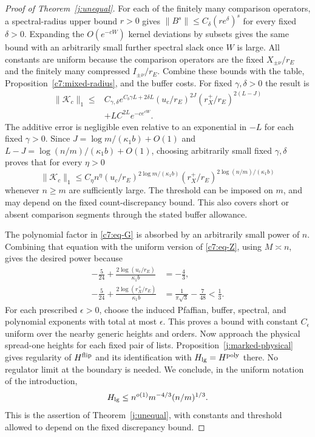 \begin{proof}[Proof of Theorem~\ref{j:unequal}]
For each of the finitely many comparison operators, a spectral-radius
upper bound $r>0$ gives $\|B^s\|\le C_\delta(re^\delta)^s$ for every
fixed $\delta>0$. Expanding the $O(e^{-cW})$ kernel deviations by
subsets gives the same bound with an arbitrarily small further spectral
slack once $W$ is large. All constants are uniform because the
comparison operators are the fixed $X_{\pm\nu}/r_E$ and the finitely
many compressed $I_{\pm\nu}/r_E$. Combine these bounds with the table,
Proposition~\ref{c7:mixed-radius}, and the buffer costs. For fixed
$\gamma,\delta>0$ the result is
\[
\begin{split}
 \|\mathcal K_c\|_1\le{}&C_{\gamma,\delta}
 e^{C_b\gamma L+2\delta L}
 (u_c/r_E)^{2J}(r_X^+/r_E)^{2(L-J)}\\
 &+LC^{2L}e^{-c e^{cW}}.
\end{split}
\]
The additive error is negligible even relative to an exponential in
$-L$ for each fixed $\gamma>0$. Since
$J=\log m/(\kappa_1b)+O(1)$ and
$L-J=\log(n/m)/(\kappa_1b)+O(1)$, choosing arbitrarily small fixed
$\gamma,\delta$ proves that for every $\eta>0$
\[
 \|\mathcal K_c\|_1\le C_\eta n^\eta
 (u_c/r_E)^{2\log m/(\kappa_1b)}
 (r_X^+/r_E)^{2\log(n/m)/(\kappa_1b)}
\]
whenever $n\ge m$ are sufficiently large. The threshold can be imposed
on $m$, and may depend on the fixed count-discrepancy bound. This also
covers short or absent comparison segments through the stated buffer
allowance.

The polynomial factor in \eqref{c7:eq-G} is absorbed by an arbitrarily
small power of $n$. Combining that equation with the uniform version
of \eqref{c7:eq-Z}, using $M\asymp n$, gives the desired power because
\[
\begin{aligned}
 -\frac5{24}+\frac{2\log(u_c/r_E)}{\kappa_1b}&=-\frac43,\\
 -\frac5{24}+\frac{2\log(r_X^+/r_E)}{\kappa_1b}
 &=\frac1{\pi\sqrt3}-\frac7{48}<\frac13.
\end{aligned}
\]
For each prescribed $\epsilon>0$, choose the induced Pfaffian, buffer,
spectral, and polynomial exponents with total at most $\epsilon$. This proves a
bound with constant $C_\epsilon$ uniform over the nearby generic
heights and orders. Now approach the physical spread-one heights for
each fixed pair of lists. Proposition~\ref{j:marked-physical} gives
regularity of $H^{\rm flip}$ and its identification with
$H_{\rm lg}=H^{\rm poly}$ there. No regulator limit at the boundary is
needed. We conclude, in the uniform notation of the introduction,
\begin{equation}\label{c7:eq-U}
 H_{\rm lg}\le n^{o(1)}m^{-4/3}(n/m)^{1/3}.
\end{equation}
This is the assertion of Theorem~\ref{j:unequal}, with constants and
threshold allowed to depend on the fixed discrepancy bound.
\end{proof}

